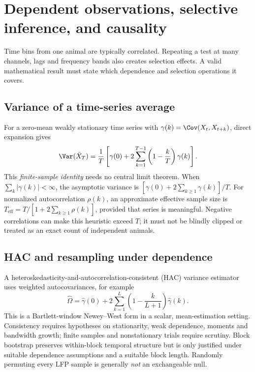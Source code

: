 \chapter[Dependent inference and causality]{Dependent observations, selective inference, and causality}
\label{ch:dependent-inference}
Time bins from one animal are typically correlated.
Repeating a test at many channels, lags and frequency bands
also creates selection effects. A valid mathematical result
must state which dependence and selection operations it covers.

\section{Variance of a time-series average}
For a zero-mean weakly stationary time series with
$\gamma(k)=\Cov(X_t,X_{t+k})$, direct expansion gives
\[
\Var(\bar X_T)=\frac{1}{T}
\left[\gamma(0)+2\sum_{k=1}^{T-1}
\left(1-\frac{k}{T}\right)\gamma(k)\right].
\]
This \emph{finite-sample identity} needs no central limit theorem.
When $\sum_k|\gamma(k)|<\infty$, the asymptotic variance is
$[\gamma(0)+2\sum_{k\ge1}\gamma(k)]/T$.
For normalized autocorrelation $\rho(k)$, an approximate effective
sample size is
$T_{\mathrm{eff}}=T/[1+2\sum_{k\ge1}\rho(k)]$,
provided that series is meaningful. Negative correlations can make
this heuristic exceed $T$; it must not be blindly clipped or treated
as an exact count of independent animals.

\section{HAC and resampling under dependence}
A heteroskedasticity-and-autocorrelation-consistent (HAC)
variance estimator uses weighted autocovariances, for example
\[
\widehat\Omega=\widehat\gamma(0)
 +2\sum_{k=1}^{L}\left(1-\frac{k}{L+1}\right)
 \widehat\gamma(k).
\]
This is a Bartlett-window Newey--West form in a scalar,
mean-estimation setting. Consistency requires hypotheses on
stationarity, weak dependence, moments and bandwidth growth;
finite samples and nonstationary trials require scrutiny.
Block bootstrap preserves within-block temporal structure
but is only justified under suitable dependence assumptions
and a suitable block length. Randomly permuting every LFP
sample is generally \emph{not} an exchangeable null.

